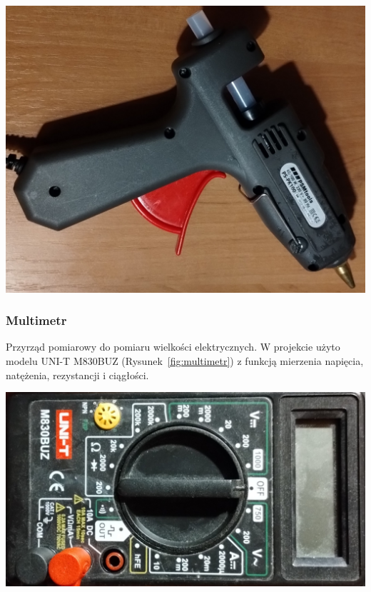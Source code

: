 \begin{center}
    \includegraphics[scale=0.09]{images/gluegun.jpg}
    \label{fig:gluegun}
\end{center}

\subsubsection*{Multimetr}
Przyrząd pomiarowy do pomiaru wielkości elektrycznych. W projekcie użyto modelu UNI-T M830BUZ (Rysunek~\ref{fig:multimetr}) z funkcją mierzenia napięcia, natężenia, rezystancji i ciągłości.

\begin{center}
    \includegraphics[scale=0.13]{images/multimetr.jpg}
    \label{fig:multimetr}
\end{center}

